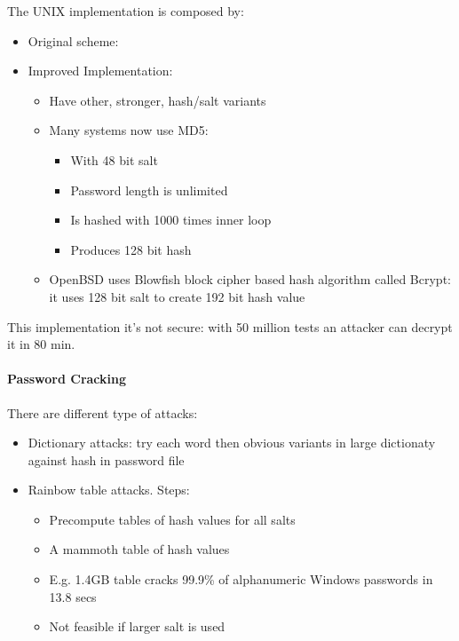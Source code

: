 The UNIX implementation is composed by:
\begin{itemize}
  \item Original scheme:
  \item Improved Implementation:
  \begin{itemize}
    \item Have other, stronger, hash/salt variants
    \item Many systems now use MD5:
    \begin{itemize}
      \item With 48 bit salt
      \item Password length is unlimited
      \item Is hashed with 1000 times inner loop
      \item Produces 128 bit hash
    \end{itemize}
    \item OpenBSD uses Blowfish block cipher based hash algorithm called
Bcrypt: it uses 128 bit salt to create 192 bit hash value
  \end{itemize}
\end{itemize}
This implementation it's not secure: with 50 million tests an attacker can
decrypt it in 80 min.

\paragraph*{Password Cracking}
There are different type of attacks:
\begin{itemize}
  \item Dictionary attacks: try each word then obvious variants in large
dictionaty against hash in password file
  \item Rainbow table attacks. Steps:
  \begin{itemize}
    \item Precompute tables of hash values for all salts
    \item A mammoth table of hash values
    \item E.g. 1.4GB table cracks 99.9\% of alphanumeric Windows passwords in
13.8 secs
    \item Not feasible if larger salt is used
  \end{itemize}
\end{itemize}

